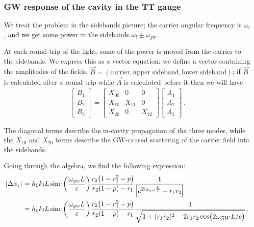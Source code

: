 \documentclass[main.tex]{subfiles}
\begin{document}
\subsubsection{GW response of the cavity in the TT gauge}

We treat the problem in the sidebands picture; the carrier angular frequency is \(\omega_{l}\), and we get some power in the sidebands \(\omega_{l} \pm \omega_{gw}\). 

At each round-trip of the light, some of the power is moved from the carrier to the sidebands. 
We express this as a vector equation: we define a vector containing the amplitudes of the fields, \(\vec{B} = (\text{carrier}, \text{upper sideband}, \text{lower sideband})\); if \(\vec{B}\) is calculated after a round trip while \(\vec{A}\) is calculated before it then we will have  
%
\begin{subequations}
\begin{align}
\left[\begin{array}{c}
B_1  \\ 
B_2  \\ 
B_3 
\end{array}\right]
=
\left[\begin{array}{ccc}
X_{00}  & 0 & 0 \\ 
X_{10}  & X_{11}  & 0 \\ 
X_{20}  & 0 & X_{22} 
\end{array}\right]
\left[\begin{array}{c}
A_1  \\ 
A_2  \\ 
A_3 
\end{array}\right]
\,.
\end{align}
\end{subequations}
%

The diagonal terms describe the in-cavity propagation of the three modes, while the \(X_{10} \) and \(X_{20} \) terms describe the GW-caused scattering of the carrier field into the sidebands. 

Going through the algebra, we find the following expression: 
%
\begin{align}
\abs{\Delta \phi_{x}} 
&= h_0 k_{l} L \operatorname{sinc} \qty( \frac{\omega_{gw}L}{c}) \frac{r_2 \qty(1 - r_1^2 - p )}{r_2 (1 - p) - r_1 }  \frac{1}{\abs{e^{2 i \omega_{gw} \frac{L}{c}} - r_1 r_2} } \\ 
&= h_0 k_{l} L \operatorname{sinc} \qty( \frac{\omega_{gw}L}{c}) \frac{r_2 \qty(1 - r_1^2 - p )}{r_2 (1 - p) - r_1 }  \frac{1}{\sqrt{1 + (r_1 r_2 )^2 - 2 r_1 r_2 \cos( 2 \omega_{GW} L / c)}}
\,.
\end{align}
\end{document}
